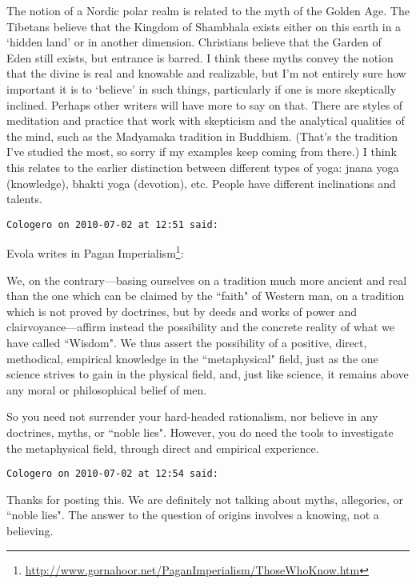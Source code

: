 \begin{footnotesize}
\begin{sffamily}
The notion of a Nordic polar realm is related to the myth of the Golden Age. The Tibetans believe that the Kingdom of Shambhala exists either on this earth in a `hidden land' or in another dimension. Christians believe that the Garden of Eden still exists, but entrance is barred. I think these myths convey the notion that the divine is real and knowable and realizable, but I'm not entirely sure how important it is to `believe' in such things, particularly if one is more skeptically inclined. Perhaps other writers will have more to say on that. There are styles of meditation and practice that work with skepticism and the analytical qualities of the mind, such as the Madyamaka tradition in Buddhism. (That's the tradition I've studied the most, so sorry if my examples keep coming from there.) I think this relates to the earlier distinction between different types of yoga: jnana yoga (knowledge), bhakti yoga (devotion), etc. People have different inclinations and talents.


\hfill

\texttt{Cologero on 2010-07-02 at 12:51 said: }

Evola writes in Pagan Imperialism\footnote{\url{http://www.gornahoor.net/PaganImperialism/ThoseWhoKnow.htm}}:

\begin{quotex}
We, on the contrary—basing ourselves on a tradition much more ancient and real than the one which can be claimed by the ``faith" of Western man, on a tradition which is not proved by doctrines, but by deeds and works of power and clairvoyance—affirm instead the possibility and the concrete reality of what we have called ``Wisdom". We thus assert the possibility of a positive, direct, methodical, empirical knowledge in the ``metaphysical" field, just as the one science strives to gain in the physical field, and, just like science, it remains above any moral or philosophical belief of men. 

\end{quotex}
So you need not surrender your hard-headed rationalism, nor believe in any doctrines, myths, or ``noble lies". However, you do need the tools to investigate the metaphysical field, through direct and empirical experience.


\hfill

\texttt{Cologero on 2010-07-02 at 12:54 said: }

Thanks for posting this. We are definitely not talking about myths, allegories, or ``noble lies". The answer to the question of origins involves a knowing, not a believing.



\end{sffamily}
\end{footnotesize}
